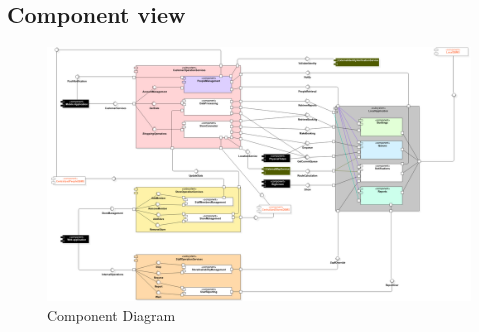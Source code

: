 \subsection{Component view}

\begin{figure}[h!]
	\includegraphics[width=\linewidth]{../Diagrams/ComponentDiagram.png}
	\caption{Component Diagram}
	\label{fig:CompDgm}
\end{figure}

